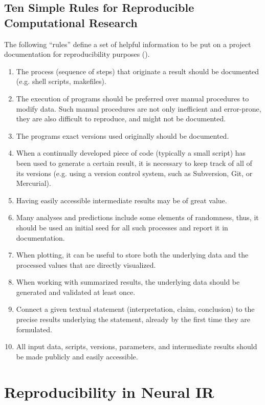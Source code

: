 \subsection{Ten Simple Rules for Reproducible Computational Research}

The following ``rules'' define a set of helpful information to be put on a project documentation for reproducibility purposes (\cite{10reprule}).

\begin{enumerate}
    \item The process (sequence of steps) that originate a result should be documented (e.g. shell scripts, makefiles).
    \item The execution of programs should be preferred over manual procedures to modify data. Such manual procedures are not only inefficient and error-prone, they are also difficult to reproduce, and might not be documented.
    \item The programs exact versions used originally should be documented.
    \item When a continually developed piece of code (typically a small script) has been used to generate a certain result, it is necessary to keep track of all of its versions (e.g. using a version control system, such as Subversion, Git, or Mercurial).
    \item Having easily accessible intermediate results may be of great value.
    \item Many analyses and predictions include some elements of randomness, thus, it should be used an initial seed for all such processes and report it in documentation.
    \item When plotting, it can be useful to store both the underlying data and the processed values that are directly visualized.
    \item When working with summarized results, the underlying data should be generated and validated at least once.
    \item Connect a given textual statement (interpretation, claim, conclusion) to the precise results underlying the statement, already by the first time they are formulated.
    \item All input data, scripts, versions, parameters, and intermediate results should be made publicly and easily accessible.
\end{enumerate}

\section{Reproducibility in Neural IR}


